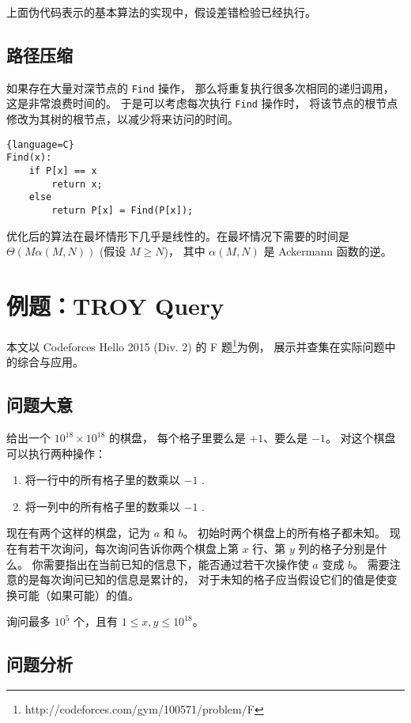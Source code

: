 \documentclass[withoutpreface,bwprint]{cumcmthesis}
\begin{document}
上面伪代码表示的基本算法的实现中，假设差错检验已经执行。

\subsection{路径压缩}

如果存在大量对深节点的 \verb|Find| 操作，
那么将重复执行很多次相同的递归调用，这是非常浪费时间的。
于是可以考虑每次执行 \verb|Find| 操作时，
将该节点的根节点修改为其树的根节点，以减少将来访问的时间。

\begin{lstlisting}{language=C}
Find(x):
	if P[x] == x
		return x;
	else
		return P[x] = Find(P[x]);
\end{lstlisting}

优化后的算法在最坏情形下几乎是线性的。在最坏情况下需要的时间是
$\Theta(M\alpha(M,N))$ (假设 $M\ge N$)，
其中 $\alpha(M, N)$ 是 Ackermann 函数的逆。

\section{例题：TROY Query}

本文以 Codeforces Hello 2015 (Div. 2) 的 F 题\footnote{http://codeforces.com/gym/100571/problem/F}为例，
展示并查集在实际问题中的综合与应用。

\subsection{问题大意}

给出一个 $10^{18} \times 10^{18}$ 的棋盘，
每个格子里要么是 $+1$、要么是 $-1$。
对这个棋盘可以执行两种操作：

\begin{enumerate}
\item 将一行中的所有格子里的数乘以 $-1$ .
\item 将一列中的所有格子里的数乘以 $-1$ .
\end{enumerate}

现在有两个这样的棋盘，记为 $a$ 和 $b$。
初始时两个棋盘上的所有格子都未知。
现在有若干次询问，每次询问告诉你两个棋盘上第 $x$ 行、第 $y$ 列的格子分别是什么。
你需要指出在当前已知的信息下，能否通过若干次操作使 $a$ 变成 $b$。
需要注意的是每次询问已知的信息是累计的，
对于未知的格子应当假设它们的值是使变换可能（如果可能）的值。

询问最多 $10^5$ 个，且有 $1\le x,y \le 10^{18}$。

\subsection{问题分析}
\end{document}
